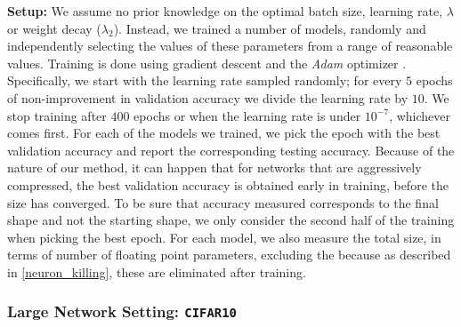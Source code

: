 \noindent\textbf{Setup: }
We assume no prior knowledge on the optimal batch size, learning rate, $\lambda$
or weight decay ($\lambda_2$). Instead, we trained a number of models, randomly
and independently selecting the values of these parameters from a range of
reasonable values.
Training is done using gradient descent and the \textit{Adam}
optimizer \cite{DBLP:journals/corr/KingmaB14}. Specifically, we start with the
learning rate sampled randomly; for every $5$ epochs of non-improvement in
validation accuracy we divide the learning rate by $10$. We stop training after
$400$ epochs or when the learning rate is under $10^{-7}$, whichever comes
first. For each of the models we trained, we pick the
epoch with the best validation accuracy and report the corresponding testing
accuracy. Because of the nature of our method, it can happen that for networks
that are aggressively compressed, the best validation accuracy is obtained early
in  training, before the size has converged. To be sure that accuracy measured
corresponds to the final shape and not the starting shape, we only consider the
second half of the training when picking the best epoch. For each model, we also
measure the total size, in terms of number of floating point parameters,
excluding the \swls because as described in
\cref{neuron_killing}, these are eliminated after training.




\subsubsection{Large Network Setting: \texttt{CIFAR10}}



